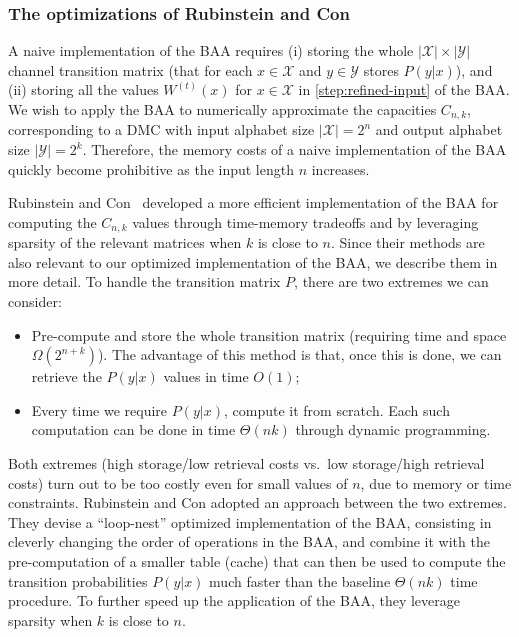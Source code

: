 \documentclass[11pt]{article}
\newcommand{\cX}{\mathcal{X}}
\newcommand{\cY}{\mathcal{Y}}
\begin{document}
\subsubsection{The optimizations of Rubinstein and Con}\label{sec:rc}

A naive implementation of the BAA requires (i) storing the whole $|\cX|\times|\cY|$ channel transition matrix (that for each $x\in\cX$ and $y\in\cY$ stores $P(y|x)$), and (ii) storing all the values $W^{(t)}(x)$ for $x\in\cX$ in \cref{step:refined-input} of the BAA.
We wish to apply the BAA to numerically approximate the capacities $C_{n,k}$, corresponding to a DMC with input alphabet size $|\cX|=2^n$ and output alphabet size $|\cY|=2^k$.
Therefore, the memory costs of a naive implementation of the BAA quickly become prohibitive as the input length $n$ increases.

Rubinstein and Con~\cite{RC23} developed a more efficient implementation of the BAA for computing the $C_{n,k}$ values through time-memory tradeoffs and by leveraging sparsity of the relevant matrices when $k$ is close to $n$.
Since their methods are also relevant to our optimized implementation of the BAA, we describe them in more detail.
To handle the transition matrix $P$, there are two extremes we can consider:
\begin{itemize}
    \item Pre-compute and store the whole transition matrix (requiring time and space $\Omega(2^{n+k})$). The advantage of this method is that, once this is done, we can retrieve the $P(y|x)$ values in time $O(1)$;

    \item Every time we require $P(y|x)$, compute it from scratch.
    Each such computation can be done in time $\Theta(nk)$ through dynamic programming.
\end{itemize}
Both extremes (high storage/low retrieval costs vs.\ low storage/high retrieval costs) turn out to be too costly even for small values of $n$, due to memory or time constraints.
Rubinstein and Con adopted an approach between the two extremes.
They devise a ``loop-nest'' optimized implementation of the BAA, consisting in cleverly changing the order of operations in the BAA, and combine it with the pre-computation of a smaller table (cache) that can then be used to compute the transition probabilities $P(y|x)$ much faster than the baseline $\Theta(nk)$ time procedure.
To further speed up the application of the BAA, they leverage sparsity when $k$ is close to $n$.
\end{document}
